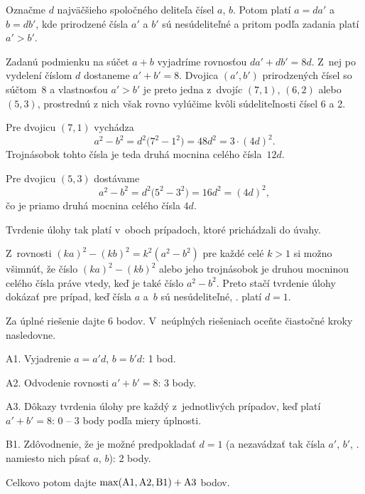 {%
Označme $d$ najväčšieho spoločného deliteľa čísel $a$, $b$. Potom
platí $a =da'$ a~$b = db'$, kde prirodzené čísla $a'$ a $b'$ sú
nesúdeliteľné a pritom podľa zadania platí $a'>b'$.

Zadanú podmienku na súčet $a+b$ vyjadríme rovnosťou $da'+db'=8d$.
Z~nej po vydelení číslom $d$ dostaneme
$a'+b'=8$. Dvojica $(a',b')$ prirodzených čísel so súčtom~8
a vlastnosťou $a'>b'$ je preto jedna z~dvojíc
$(7,1)$, $(6,2)$ alebo $(5,3)$, prostrednú
z nich však rovno vylúčime kvôli súdeliteľnosti čísel 6 a 2.


Pre dvojicu $(7, 1)$ vychádza
$$
a^2-b^2=d^2\bigl(7^2-1^2\bigr)=48d^2=3\cdot(4d)^2.
$$
Trojnásobok tohto čísla je teda druhá mocnina celého čísla~$12d$.

Pre dvojicu $(5,3)$ dostávame
$$
a^2-b^2=d^2\bigl(5^2-3^2\bigr) =16d^2=(4d)^2,
$$
čo je priamo druhá mocnina celého čísla $4d$.

Tvrdenie úlohy tak platí v~oboch prípadoch, ktoré prichádzali do úvahy.

\poznamka
Z~rovnosti $(ka)^2-(kb)^2=k^2(a^2 - b^2)$ pre každé celé $k>1$
si možno všimnúť, že číslo $(ka)^2-(kb)^2$ alebo jeho
trojnásobok je druhou mocninou celého čísla práve vtedy,
keď je také číslo $a^2 - b^2$. Preto stačí tvrdenie úlohy
dokázať pre prípad, keď čísla $a$ a~$b$ sú nesúdeliteľné, \tj.
platí $d=1$.


\schemaABC
Za úplné riešenie dajte 6 bodov. V~neúplných riešeniach oceňte
čiastočné kroky nasledovne.

\smallskip
\item{A1.} Vyjadrenie $a = a'd$, $b = b'd$: 1 bod.
\item{A2.} Odvodenie rovnosti $a'+b'=8$: 3 body.
\item{A3.} Dôkazy tvrdenia úlohy pre každý z~jednotlivých prípadov, keď platí $a'+b'=8$: 0 -- 3 body podľa miery úplnosti.
\item{B1.} Zdôvodnenie, že je možné predpokladať $d=1$ (a nezavádzať tak čísla $a'$, $b'$, \tj. namiesto nich písať $a$, $b$): 2 body.

\smallskip\noindent
Celkovo potom dajte $\rm\max(A1,A2,B1)+A3$ bodov.
\endschema
}

